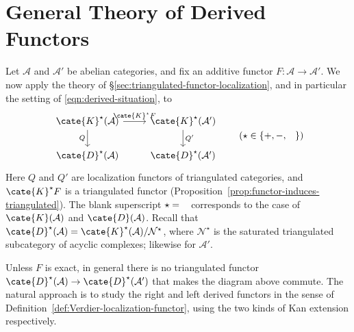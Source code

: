 
\section{General Theory of Derived Functors}\label{sec:derived-functors}
\hypertarget{o014.aljabr2.chapter4.derived-functors-general}{ }

Let $\mathcal{A}$ and $\mathcal{A}'$ be abelian categories, and fix an
additive functor $F:\mathcal{A}\to\mathcal{A}'$. We now apply the theory of
\S\ref{sec:triangulated-functor-localization}, and in particular the setting
of \eqref{eqn:derived-situation}, to
\begin{equation*}\begin{tikzcd}
	\cate{K}^{\star}(\mathcal{A}) \arrow[r, "{\cate{K}^\star F}"] \arrow[d, "Q"'] & \cate{K}^{\star}(\mathcal{A}') \arrow[d, "{Q'}"] \\
	\cate{D}^{\star}(\mathcal{A}) & \cate{D}^{\star}(\mathcal{A}')
\end{tikzcd} \qquad (\star \in \{+, -, \hspace{0.8em}\}) \end{equation*}
Here $Q$ and $Q'$ are localization functors of triangulated categories, and
$\cate{K}^\star F$ is a triangulated functor
(Proposition~\ref{prop:functor-induces-triangulated}). The blank superscript
$\star=\hspace{0.8em}$ corresponds to the case of $\cate{K}(\mathcal{A})$
and $\cate{D}(\mathcal{A})$. Recall that
$\cate{D}^{\star}(\mathcal{A})=\cate{K}^{\star}(\mathcal{A})/\mathcal{N}^{\star}$,
where $\mathcal{N}^{\star}$ is the saturated triangulated subcategory of
acyclic complexes; likewise for $\mathcal{A}'$.

Unless $F$ is exact, in general there is no triangulated functor
$\cate{D}^{\star}(\mathcal{A})\to\cate{D}^{\star}(\mathcal{A}')$ that makes
the diagram above commute. The natural approach is to study the right and left
derived functors in the sense of
Definition~\ref{def:Verdier-localization-functor}, using the two kinds of Kan
extension respectively.

